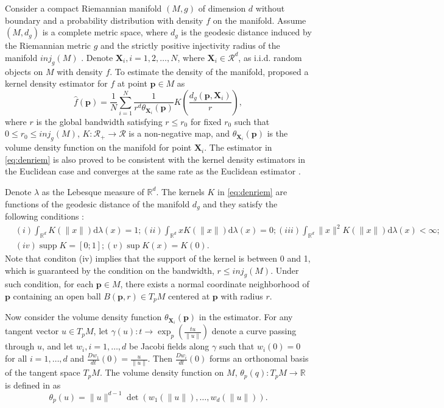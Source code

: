 \documentclass[11pt,a4paper,]{article}
\DeclareMathOperator\supp{supp}
\begin{document}
Consider a compact Riemannian manifold \((M, g)\) of dimension \(d\) without boundary and a probability distribution with density \(f\) on the manifold. Assume \((M, d_g)\) is a complete metric space, where \(d_g\) is the geodesic distance induced by the Riemannian metric \(g\) and the strictly positive injectivity radius of the manifold \(inj_g(M)\) \autocite{Chavel2006-mp}. Denote \(\pmb{X}_i, i = 1, 2, \dots, N\), where \(\pmb{X}_i \in \mathcal{R}^d\), as i.i.d. random objects on \(M\) with density \(f\). To estimate the density of the manifold, \textcite{Pelletier2005-vu} proposed a kernel density estimator for \(f\) at point \(\pmb{p}\in M\) as
\begin{equation}
\label{eq:denriem}
\hat{f}(\pmb{p}) = \frac{1}{N} \sum_{i=1}^{N} \frac{1}{r^d \theta_{\pmb{X}_i}(\pmb{p})} K(\frac{d_g(\pmb{p}, \pmb{X}_i)}{r}),
\end{equation}
where \(r\) is the global bandwidth satisfying \(r \leq r_0\) for fixed \(r_0\) such that \(0\leq r_0\leq inj_g(M)\), \(K: \mathcal{R}_{+} \rightarrow \mathcal{R}\) is a non-negative map, and \(\theta_{\pmb{X}_i}(\pmb{p})\) is the volume density function on the manifold for point \(\pmb{X}_i\). The estimator in \eqref{eq:denriem} is also proved to be consistent with the kernel density estimators in the Euclidean case and converges at the same rate as the Euclidean estimator \autocite{Henry2009-ll}.

Denote \(\lambda\) as the Lebesque measure of \(\mathbb{R}^d\). The kernels \(K\) in \eqref{eq:denriem} are functions of the geodesic distance of the manifold \(d_g\) and they satisfy the following conditions \autocite{Pelletier2005-vu}:
\begin{align}
\label{eq:kernelcondition}
& (i) \int_{\mathbb{R}^{d}} K(\|x\|) \mathrm{d} \lambda(x)=1;
(ii) \int_{\mathbb{R}^{d}} x K(\|x\|) \mathrm{d} \lambda(x)=0;
(iii) \int_{\mathbb{R}^{d}}\|x\|^{2} K(\|x\|) \mathrm{d} \lambda(x)<\infty; \\
& (iv) \supp K=[0; 1];
(v) \sup K(x)=K(0).
\end{align}
Note that conditon (iv) implies that the support of the kernel is between 0 and 1, which is guaranteed by the condition on the bandwidth, \(r\leq inj_g(M)\). Under such condition, for each \(\pmb{p} \in M\), there exists a normal coordinate neighborhood of \(\pmb{p}\) containing an open ball \(B(\pmb{p}, r) \in T_pM\) centered at \(\pmb{p}\) with radius \(r\).

Now consider the volume density function \(\theta_{\pmb{X}_i}(\pmb{p})\) in the estimator.
For any tangent vector \(u \in T_pM\), let \(\gamma(u): t \rightarrow \exp_p(\frac{tu}{\|u\|})\) denote a curve passing through \(u\), and let \(w_i, i=1,\dots,d\) be Jacobi fields along \(\gamma\) such that \(w_i(0)=0\) for all \(i=1,\dots,d\) and \(\frac{Dw_1}{dt}(0)=\frac{u}{\|u\|}\). Then \(\frac{Dw_i}{dt}(0)\) forms an orthonomal basis of the tangent space \(T_pM\).
The volume density function on \(M\), \(\theta_p(q): T_pM \rightarrow \mathbb{R}\) is defined in \textcite{Le_Brigant2019-lj} as
\begin{equation}
\label{eq:volden}
\theta_p(u) = \|u\|^{d-1} \det(w_1(\|u\|),\dots,w_d(\|u\|)).
\end{equation}
\end{document}
